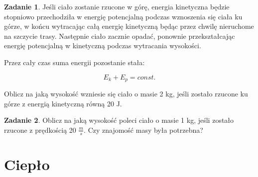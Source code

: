 \documentclass[11pt]{article}
\theoremstyle{definition}
\newtheorem{zad}{Zadanie}
\numberwithin{zad}{section}
\begin{document}
\begin{zad}
Jeśli ciało zostanie rzucone w górę, energia kinetyczna będzie stopniowo przechodziła w energię potencjalną podczas wznoszenia się ciała ku górze, w końcu wytracając całą energię kinetyczną będąc przez chwilę nieruchome na szczycie trasy. Następnie ciało zacznie opadać, ponownie przekształcając energię potencjalną w kinetyczną podczas wytracania wysokości.

Przez cały czas suma energii pozostanie stała:

\begin{equation}
E_k + E_p = const.
\end{equation}

Oblicz na jaką wysokość wzniesie się ciało o masie 2 kg, jeśli zostało rzucone ku górze z energią kinetyczną równą 20 J.
\end{zad}

\begin{zad}
Oblicz na jaką wysokość poleci ciało o masie 1 kg, jeśli zostało rzucone z prędkością 20 $\frac ms$. Czy znajomość masy była potrzebna?
\end{zad}

\section{Ciepło}
\end{document}
